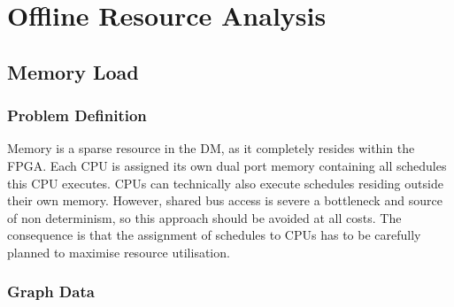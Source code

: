 \chapter{Offline Resource Analysis}

\section{Memory Load}

\subsection{Problem Definition}
Memory is a sparse resource in the DM, as it completely resides within the FPGA. Each CPU is assigned its own dual port memory containing all schedules this CPU executes. CPUs can technically also execute schedules residing outside their own memory. However, shared bus access is severe a bottleneck and source of non determinism, so this approach should be avoided at all costs. The consequence is that the assignment of schedules to CPUs has to be carefully planned to maximise resource utilisation.


\subsection{Graph Data}

